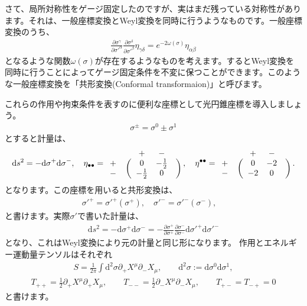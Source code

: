 \documentclass[report,paper=a4, fontsize=12pt, line_length=16cm, number_of_lines=34,dvipdfmx]{jlreq}
\numberwithin{equation}{chapter}
\numberwithin{equation}{section}
\newcommand{\del}{\partial}
\newcommand{\di}{\mathrm{d}}
\begin{document}
さて、局所対称性をゲージ固定したのですが、実はまだ残っている対称性があります。それは、一般座標変換とWeyl変換を同時に行うようなものです。一般座標変換のうち、
\begin{align}
\frac{\del \sigma^{\gamma}}{\del \sigma'^{\alpha}}
\frac{\del \sigma^{\delta}}{\del \sigma'^{\beta}}
\eta_{\gamma\delta}
=e^{-2\omega(\sigma)}\eta_{\alpha\beta}
\end{align}
となるような関数$\omega(\sigma)$が存在するようなものを考えます。するとWeyl変換を同時に行うことによってゲージ固定条件を不変に保つことができます。このような一般座標変換を「共形変換(Conformal transformaion)」と呼びます。

これらの作用や拘束条件を表すのに便利な座標として光円錐座標を導入しましょう。
\begin{align}
\sigma^{\pm}=\sigma^{0}\pm\sigma^{1}
\end{align}
とすると計量は、
\begin{align}
\di s^2=-\di \sigma^{+}\di \sigma^{-},\quad
\eta_{\bullet\bullet}=
\begin{array}{crccl}
      && + & - & \\
 + &\ldelim({2}{4pt}[] &0     & -\frac12 &\rdelim){2}{4pt}[]          \\
 - &  &-\frac12      & 0  &
\end{array}
,\quad
\eta^{\bullet\bullet}=
\begin{array}{crccl}
      && + & - & \\
 + &\ldelim({2}{4pt}[] &0     & -2 &\rdelim){2}{4pt}[]          \\
 - &  &-2      & 0  &
\end{array}.
\end{align}
となります。この座標を用いると共形変換は、
\begin{align}
\sigma'^{+}=\sigma'^{+}(\sigma^{+}),\quad
\sigma'^{-}=\sigma'^{-}(\sigma^{-}),\quad
\end{align}
と書けます。実際$\sigma'$で書いた計量は、
\begin{align}
\di s^2=-\di \sigma^{+}\di \sigma^{-}
=-
\frac{\del \sigma^{+}}{\del \sigma^{+}}
\frac{\del \sigma^{-}}{\del \sigma^{-}}
\di \sigma'^{+}\di \sigma'^{-}
\end{align}
となり、これはWeyl変換により元の計量と同じ形になります。
作用とエネルギー運動量テンソルはそれぞれ
\begin{align}
S=\frac{1}{2\pi}\int \di^2\sigma \del_{+}X^{\mu}\del_{-}X_{\mu},\qquad \di^2\sigma:=\di\sigma^0 \di\sigma^1,
\label{fixed-action}
\end{align}
\begin{align}
T_{++}=\frac12 \del_{+}X^{\mu}\del_{+}X_{\mu},\qquad
T_{--}=\frac12 \del_{-}X^{\mu}\del_{-}X_{\mu},\qquad
T_{+-}=T_{-+}=0
\label{fixed-em}
\end{align}
と書けます。
\end{document}
